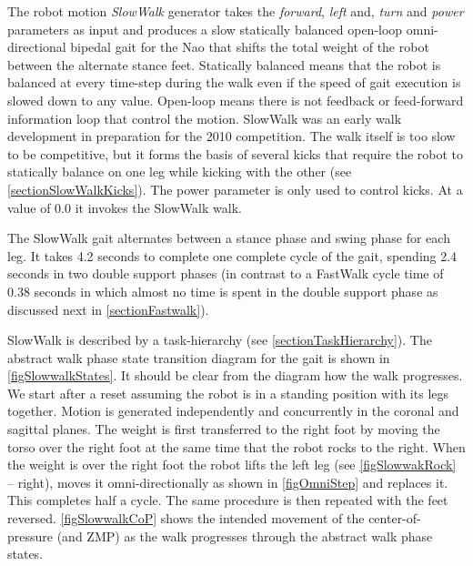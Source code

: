 \documentclass[pdftex,11pt,a4paper]{report}
\begin{document}
The robot motion \emph{SlowWalk} generator takes the \emph{forward}, \emph{left} and, \emph{turn} and \emph{power}  parameters as input and produces a slow statically balanced open-loop omni-directional bipedal gait for the Nao that shifts the total weight of the robot between the alternate stance feet. Statically balanced means that the robot is balanced at every time-step during the walk even if the speed of gait execution is slowed down to any value. Open-loop means there is not feedback or feed-forward information loop that control the motion. SlowWalk was an early walk development in preparation for the 2010 competition. The walk itself is too slow to be competitive, but it forms the basis of several kicks that require the robot to statically balance on one leg while kicking with the other (see \autoref{sectionSlowWalkKicks}). The power parameter is only used to control kicks. At a value of $0.0$ it invokes the SlowWalk walk.

The SlowWalk gait alternates between a stance phase and swing phase for each leg. It takes 4.2 seconds to complete one complete cycle of the gait, spending 2.4 seconds in two double support phases (in contrast to a FastWalk cycle time  of  0.38 seconds in which almost no time is spent in the double support phase as discussed next in \autoref{sectionFastwalk}).

SlowWalk is described by a task-hierarchy (see \autoref{sectionTaskHierarchy}). The abstract walk phase state transition diagram for the gait is shown in \autoref{figSlowwalkStates}. It should be clear from the diagram how the walk progresses. We start after a reset assuming the robot is in a standing position with its legs together. Motion is generated independently and concurrently in the coronal and sagittal planes. The weight is first transferred to the right foot by moving the torso over the right foot at the same time that the robot rocks to the right. When the weight is over the right foot the robot lifts the left leg (see \autoref{figSlowwakRock} -- right), moves it omni-directionally as shown in \autoref{figOmniStep}  and replaces it. This completes half a cycle. The same procedure is then repeated with the feet reversed. \autoref{figSlowwalkCoP} shows the intended movement of the center-of-pressure (and ZMP) as the walk progresses through the abstract walk phase states. 
\end{document}
